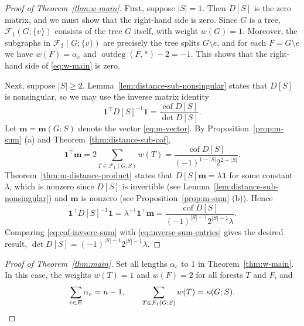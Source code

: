 \documentclass[12pt]{amsart}
\theoremstyle{definition}
\newcommand{\bone}{\mathbf{1}}
\newcommand{\boldm}{\mathbf{m}}
\newcommand{\tr}{\intercal}
\DeclareMathOperator{\cof}{cof}
\newcommand{\trees}{\mathcal{F}_1}
\newcommand{\forests}{\mathcal{F}}
\DeclareMathOperator{\outdeg}{outdeg}
\begin{document}
\begin{proof}[Proof of Theorem~\ref{thm:w-main}]
First, suppose $|S| = 1$.
Then $D[S]$ is the zero matrix, and we must show that the right-hand side is zero.
Since $G$ is a tree, $\trees(G; \{v\})$ consists of the tree $G$ itself, with weight $w({G}) = 1$.
Moreover, the subgraphs in $\forests_2(G; \{v\})$ are precisely the tree splits $G \setminus e$, and for each $F = G \setminus e$ we have 
$w({F}) = \alpha_e$ and
$\outdeg(F, *) - 2 = -1$.
This shows that the right-hand side of \eqref{eq:w-main} is zero.

Next, suppose $|S| \geq 2$.
Lemma~\ref{lem:distance-sub-nonsingular} states that $D[S]$ is nonsingular, so we may use the inverse matrix identity
\begin{equation}\label{eq:cof-invsere-sum}
	\bone^\tr D[S]^{-1} \bone =
	\frac{\cof D[S]}{\det D[S]}. 
\end{equation}
Let $\boldm = \boldm(G; S)$ denote the vector \eqref{eq:m-vector}.
By 
Proposition~\ref{prop:m-sum} (a) and Theorem~\ref{thm:distance-sub-cof},
\[
	\bone^\tr \boldm 
	= 2 \sum_{T \in \trees(G;S)} w({T})
	= \frac{\cof D[S]}{(-1)^{1 - |S|} 2^{2 - |S|} }.
\]
Theorem~\ref{thm:m-distance-product} states that $D[S] \boldm = \lambda \bone$
for some constant $\lambda$,
which is nonzero since $D[S]$ is invertible (see Lemma~\ref{lem:distance-sub-nonsingular}) and $\boldm$ is nonzero (see Proposition~\ref{prop:m-sum} (b)).
Hence
\begin{equation}\label{eq:inverse-sum-entries}
	\bone^\tr D[S]^{-1} \bone
	= \lambda^{-1} \bone^\tr \boldm
	= \frac{\cof D[S]}{(-1)^{|S| - 1} 2^{|S| - 1} \lambda} .
\end{equation}
Comparing \eqref{eq:cof-invsere-sum} with \eqref{eq:inverse-sum-entries} gives the desired result,
$\det D[S] = (-1)^{|S| - 1} 2^{|S| - 1} \lambda$.
\end{proof}

\begin{proof}[Proof of Theorem~\ref{thm:main}]
Set all lengths $\alpha_e$ to $1$ in Theorem~\ref{thm:w-main}.
In this case, the weights $w({T}) = 1$ and $w({F}) = 2$ for all forests $T$ and $F$,
and 
\[
	\sum_{e \in E} \alpha_e = n - 1, 
	\qquad \sum_{T \in \trees(G;S)} w({T}) = \kappa(G; S).
	\qedhere
\]
\end{proof}
\end{document}
